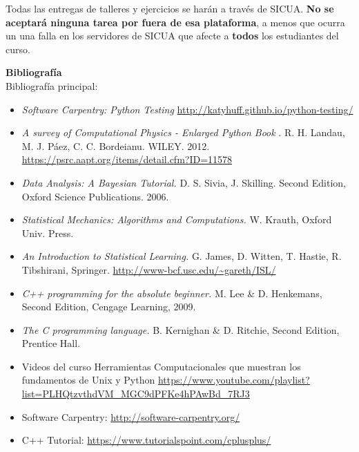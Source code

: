 \documentclass[letterpaper,10pt,onecolumn]{article}
\begin{document}
Todas las entregas de talleres y ejercicios se har\'an a trav\'es de
SICUA.  {\bf No se aceptar\'a ninguna tarea por fuera de esa
  plataforma}, a menos que ocurra un una falla en los servidores de
SICUA que afecte a {\bf todos} los estudiantes del curso.


\vspace*{0.5cm} 

\noindent\textbf{\large {} \quad
  Bibliograf\'ia}\\[-0.2cm] 



\noindent\normalsize Bibliograf\'ia principal:

\begin{itemize}
\item
\textit{Software Carpentry: Python Testing}
\url{http://katyhuff.github.io/python-testing/}

\item
\textit{A survey of Computational Physics - Enlarged Python Book}
. R. H. Landau, M. J. P\'aez, C. C. Bordeianu. WILEY. 2012.
\url{https://psrc.aapt.org/items/detail.cfm?ID=11578}

\item
\textit{Data Analysis: A Bayesian Tutorial.} D. S. Sivia,
J. Skilling. Second Edition, Oxford Science Publications. 2006.

\item 
\textit{Statistical Mechanics: Algorithms and Computations.}
W. Krauth, Oxford Univ. Press. 

\item
\textit{An Introduction to Statistical Learning.} G. James, D. Witten,
T. Hastie, R. Tibshirani,
Springer. \url{http://www-bcf.usc.edu/~gareth/ISL/} 

\item
\textit{C++ programming for the absolute beginner.}
 M. Lee \& D. Henkemans, Second Edition, Cengage Learning, 2009.

\item
\textit{The C programming language.}
 B. Kernighan \& D. Ritchie, Second Edition, Prentice Hall.

\item Videos del curso Herramientas Computacionales que muestran los
  fundamentos de Unix y Python \url{https://www.youtube.com/playlist?list=PLHQtzvthdVM_MGC9dPFKe4hPAwBd_7RJ3}

\item Software Carpentry: \url{http://software-carpentry.org/}
\item C++ Tutorial: \url{https://www.tutorialspoint.com/cplusplus/}
\end{itemize}
\end{document}
